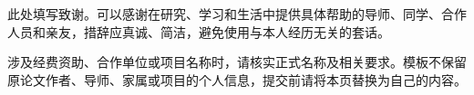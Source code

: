 \begin{acknowledgement}
此处填写致谢。可以感谢在研究、学习和生活中提供具体帮助的导师、同学、合作人员和亲友，措辞应真诚、简洁，避免使用与本人经历无关的套话。

涉及经费资助、合作单位或项目名称时，请核实正式名称及相关要求。模板不保留原论文作者、导师、家属或项目的个人信息，提交前请将本页替换为自己的内容。
\end{acknowledgement}
